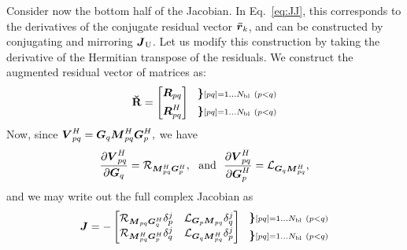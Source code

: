 \documentclass[useAMS,usenatbib]{mn2e}
\makeatletter
\newcommand{\rrc}{\bmath{\bar r}}
\newcommand{\mat}[1]{{\bmath{#1}}}
\newcommand{\JJ}{\mat{J}} %
\newcommand{\MM}{\mat{M}}
\newcommand{\RR}{\mat{R}}
\newcommand{\VV}{\mat{V}}
\newcommand{\GG}{\mat{G}}
\newcommand{\Matrix}[2]{\left [ \begin{array}{@{}#1@{}}#2\end{array} \right ]}
\newcommand{\Stack}[1]{\begin{array}{@{}c@{}}#1\end{array}}
\newcommand{\AUGx}[1]{\mathbf{\breve{#1}}}
\newcommand{\RRr}{\AUGx{R}}
\newcommand{\TOP}{\mathrm{U}}%
\newcommand{\Rop}[1]{\mathcal{R}_{{#1}}}
\newcommand{\Lop}[1]{\mathcal{L}_{{#1}}}
\numberwithin{equation}{section}
\makeatother
\begin{document}
Consider now the bottom half of the Jacobian. In Eq.~\ref{eq:JJ}, this corresponds to the derivatives of the conjugate residual
vector $\rrc_k$, and can be constructed by conjugating and mirroring $\JJ_\TOP$. Let us modify this construction 
by taking the derivative of the Hermitian transpose of the residuals. We construct the augmented residual vector of matrices
as:
\begin{equation}
\RRr = 
\Matrix{c}{
  \RR_{pq} \\[1ex] 
  \RR^H_{pq} 
} 
~~ 
\Stack{ 
\bm{\}} \scriptstyle [pq]=1\dots \Nbl~(p<q) %
\\[1ex] 
\bm{\}} \scriptstyle [pq]=1\dots \Nbl~(p<q) 
}
\label{eq:RRtranspose}
\end{equation}
Now, since $\VV^H_{pq}=\GG_q \MM^H_{pq} \GG^H_p,$ we have
\begin{equation}
\label{eq:dRH:dG}
\frac{\partial\VV^H_{pq}}{\partial\GG_q} = \Rop{\MM^H_{pq}\GG^H_p},\mathrm{~~and~~}
\frac{\partial\VV^H_{pq}}{\partial\GG^H_p} = \Lop{\GG_q \MM^H_{pq}},
\end{equation}
and we may write out the full complex Jacobian as
\begin{equation}
\JJ = - \Matrix{cc}{ 
\Rop{ \MM_{pq}\GG^H_q }\delta^j_p & 
\Lop{ \GG_p \MM_{pq}  }\delta^j_q \\
\Rop{ \MM^H_{pq} \GG^H_p } \delta^j_q & 
\Lop{ \GG_q \MM^H_{pq}  } \delta^j_p  
}~~ 
\Stack{ 
\bm{\}} \scriptstyle [pq]=1\dots \Nbl~(p<q) %
\\[1ex] 
\bm{\}} \scriptstyle [pq]=1\dots \Nbl~(p<q) 
}
\end{equation}
\end{document}
